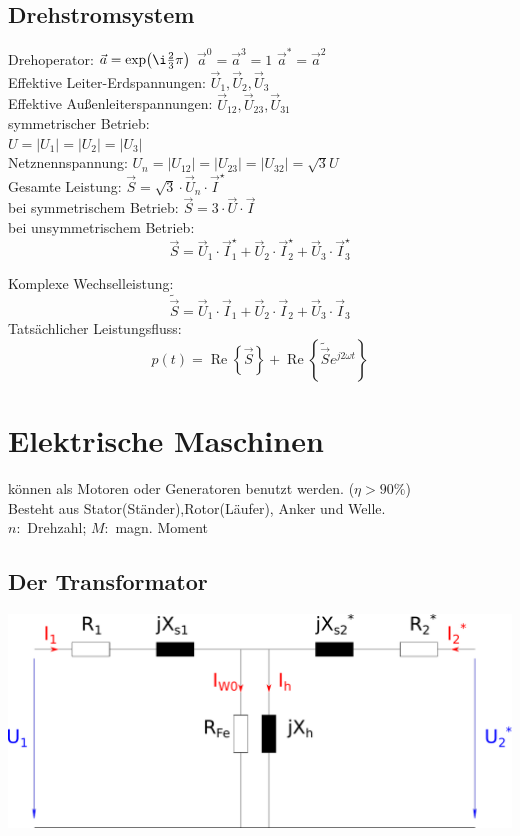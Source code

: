 \documentclass[european]{latex4ei_sheet}
\begin{document}
		\subsection{Drehstromsystem}
		Drehoperator: $\vec a = \exp\bigl(\i \frac{2}{3} \pi \bigr)$ \qquad $\vec a^0 = \vec a^3 = 1$ \quad $\vec a^* = \vec a^2$\\
		
		
		Effektive Leiter-Erdspannungen: $\vec U_1,\vec U_2,\vec U_3$\\
		Effektive Außenleiterspannungen: $\vec U_{12},\vec U_{23},\vec U_{31}$\\
		symmetrischer Betrieb:\\
		$U = |U_1| = |U_2| = |U_3|$\\
		Netznennspannung: $U_n = |U_{12}| = |U_{23}| = |U_{32}| = \sqrt{3} U$\\
		Gesamte Leistung: $\vec S = \sqrt{3} \cdot \vec U_n \cdot \vec I^\star$\\
		bei symmetrischem Betrieb: $\vec S = 3 \cdot \vec U \cdot \vec I$\\
		bei unsymmetrischem Betrieb: 
		\[\vec S = \vec U_1 \cdot \vec I_1^\star + \vec U_2 \cdot \vec I_2^\star + \vec U_3 \cdot \vec I_3^\star\]
		
		Komplexe Wechselleistung:
		\[\tilde{\vec S} = \vec U_1 \cdot \vec I_1 + \vec U_2 \cdot \vec I_2 + \vec U_3 \cdot \vec I_3\]
		Tatsächlicher Leistungsfluss:
		\[p(t) = \operatorname{Re} \left\{ \vec S \right\} + \operatorname{Re} \left\{\tilde{\vec S} e^{j 2 \omega t} \right\}\]


	\section{Elektrische Maschinen}
	können als Motoren oder Generatoren benutzt werden. ($\eta > 90\%$)\\
	Besteht aus Stator(Ständer),Rotor(Läufer), Anker und Welle.\\
	$n:$ Drehzahl; $M:$ magn. Moment\\


		\subsection{Der Transformator}
		
		\includegraphics[scale=.2]{./img/ersatzschaltbild_transformator.pdf} \\
\end{document}
